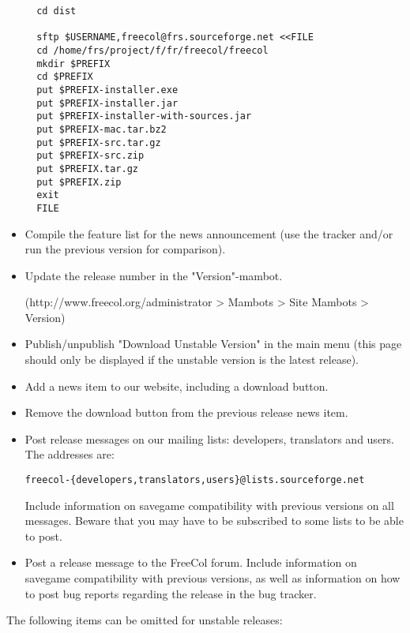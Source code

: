 \documentclass[12pt]{book}
\begin{document}
\begin{itemize}
\begin{verbatim}
  cd dist

  sftp $USERNAME,freecol@frs.sourceforge.net <<FILE
  cd /home/frs/project/f/fr/freecol/freecol
  mkdir $PREFIX
  cd $PREFIX
  put $PREFIX-installer.exe
  put $PREFIX-installer.jar
  put $PREFIX-installer-with-sources.jar
  put $PREFIX-mac.tar.bz2
  put $PREFIX-src.tar.gz
  put $PREFIX-src.zip
  put $PREFIX.tar.gz
  put $PREFIX.zip
  exit
  FILE
\end{verbatim}

\item Compile the feature list for the news announcement (use the tracker
  and/or run the previous version for comparison).

\item Update the release number in the "Version"-mambot.

  (http://www.freecol.org/administrator > Mambots > Site Mambots >
  Version)

\item Publish/unpublish "Download Unstable Version" in the main menu
  (this page should only be displayed if the unstable version is the
  latest release).

\item Add a news item to our website, including a download button.

\item Remove the download button from the previous release news item.

\item Post release messages on our mailing lists: developers,
  translators and users.  The addresses are:

\verb+freecol-{developers,translators,users}@lists.sourceforge.net+

Include information on savegame compatibility with previous versions
on all messages.  Beware that you may have to be subscribed to some
lists to be able to post.
  
\item Post a release message to the FreeCol forum. Include information
  on savegame compatibility with previous versions, as well as
  information on how to post bug reports regarding the release in the
  bug tracker.
    
\end{itemize}

The following items can be omitted for unstable releases:
\end{document}
